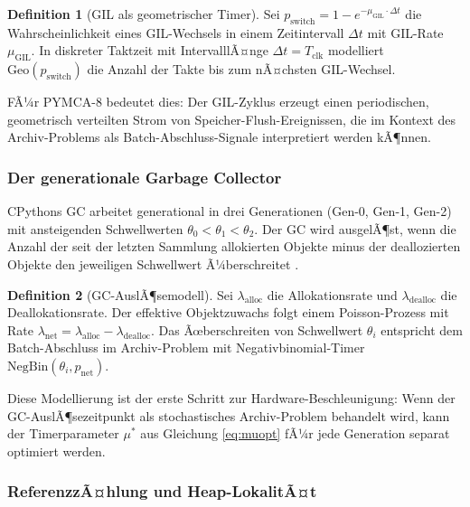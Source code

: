 ﻿\documentclass[a4paper,12pt]{scrreprt}
\theoremstyle{definition}
\newtheorem{definition}{Definition}[section]
\newcommand{\Geo}{\mathrm{Geo}}
\newcommand{\NBin}{\mathrm{NegBin}}
\begin{document}
	\begin{definition}[GIL als geometrischer Timer]
		\label{def:gil_geo}
		Sei $p_{\mathrm{switch}} = 1 - e^{-\mu_{\mathrm{GIL}} \cdot \Delta t}$ die
		Wahrscheinlichkeit eines GIL-Wechsels in einem Zeitintervall $\Delta t$
		mit GIL-Rate $\mu_{\mathrm{GIL}}$. In diskreter Taktzeit mit IntervalllÃ¤nge
		$\Delta t = T_{\mathrm{clk}}$ modelliert $\Geo(p_{\mathrm{switch}})$
		die Anzahl der Takte bis zum nÃ¤chsten GIL-Wechsel.
	\end{definition}
	
	FÃ¼r PYMCA-8 bedeutet dies: Der GIL-Zyklus erzeugt einen periodischen,
	geometrisch verteilten Strom von Speicher-Flush-Ereignissen, die im
	Kontext des Archiv-Problems als Batch-Abschluss-Signale interpretiert
	werden kÃ¶nnen.
	
	\subsubsection{Der generationale Garbage Collector}
	
	CPythons GC arbeitet generational in drei Generationen (Gen-0, Gen-1,
	Gen-2) mit ansteigenden Schwellwerten $\theta_0 < \theta_1 < \theta_2$.
	Der GC wird ausgelÃ¶st, wenn die Anzahl der seit der letzten Sammlung
	allokierten Objekte minus der deallozierten Objekte den jeweiligen
	Schwellwert Ã¼berschreitet \cite{python_gc}.
	
	\begin{definition}[GC-AuslÃ¶semodell]
		\label{def:gc_model}
		Sei $\lambda_{\mathrm{alloc}}$ die Allokationsrate und
		$\lambda_{\mathrm{dealloc}}$ die Deallokationsrate. Der effektive
		Objektzuwachs folgt einem Poisson-Prozess mit Rate
		$\lambda_{\mathrm{net}} = \lambda_{\mathrm{alloc}} - \lambda_{\mathrm{dealloc}}$.
		Das Ãœberschreiten von Schwellwert $\theta_i$ entspricht dem
		Batch-Abschluss im Archiv-Problem mit Negativbinomial-Timer
		$\NBin(\theta_i, p_{\mathrm{net}})$.
	\end{definition}
	
	Diese Modellierung ist der erste Schritt zur Hardware-Beschleunigung:
	Wenn der GC-AuslÃ¶sezeitpunkt als stochastisches Archiv-Problem
	behandelt wird, kann der Timerparameter $\mu^*$ aus Gleichung
	\eqref{eq:muopt} fÃ¼r jede Generation separat optimiert werden.
	
	\subsubsection{ReferenzzÃ¤hlung und Heap-LokalitÃ¤t}
	
\end{document}
